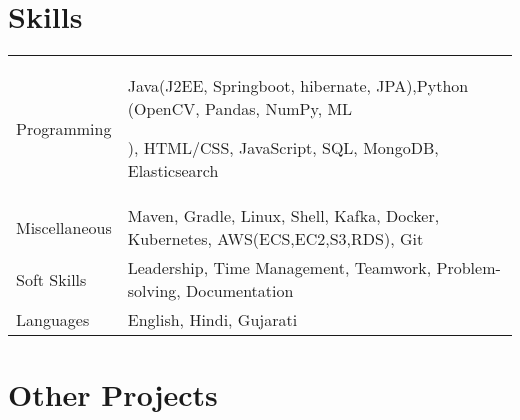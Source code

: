 \documentclass[a4paper,12pt]{article}
\begin{document}
\section{Skills}
\begin{tabularx}{\linewidth}{@{}l X@{}}
	Programming   & Java(J2EE, Springboot, hibernate, JPA),Python (OpenCV, Pandas, NumPy, ML           %
	
	
	), HTML/CSS, JavaScript, SQL, MongoDB, Elasticsearch                                               \\
	Miscellaneous & Maven, Gradle, Linux, Shell, Kafka, Docker, Kubernetes, AWS(ECS,EC2,S3,RDS), Git   \\
	Soft Skills   & Leadership, Time Management, Teamwork, Problem-solving, Documentation              \\
	Languages     & English, Hindi, Gujarati                                                         
\end{tabularx}

\section{Other Projects}
\end{document}
